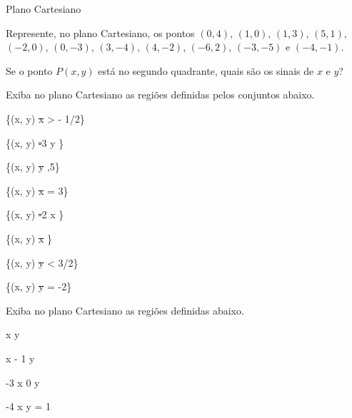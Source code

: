 \begin{exercicios}{Plano Cartesiano}
\begin{exercicio}
\begin{answers}
        \end{answers}
    \end{exercicio}

    \begin{exercicio}
        Represente, no plano Cartesiano, os pontos 
        $(0,4)$, $(1,0)$, $(1,3)$, $(5,1)$, $(-2,0)$, $(0,-3)$, $(3,-4)$, $(4,-2)$, $(-6,2)$, $(-3,-5)$ e $(-4,-1)$.
        \begin{answers}
        \end{answers}
    \end{exercicio}
    
    \begin{exercicio}
        Se o ponto $P(x,y)$ está no segundo quadrante, quais são os sinais de $x$ e $y$?
    \end{exercicio}
    
    \begin{exercicio}
        Exiba no plano Cartesiano as regiões definidas pelos conjuntos abaixo.
	    \begin{mathlist}[2]
	    	\item \{(x, y) \st x > - 1/2\}
	    	\item \{(x, y) \st -3 \leq y \leq 0\}
	    	\item \{(x, y) \st y ,5\}
	    	\item \{(x, y) \st x = 3\}
	    	\item \{(x, y) \st -2 \leq x \leq 5\}
	    	\item \{(x, y) \st x \}
	    	\item \{(x, y) \st y < 3/2\}
	    	\item \{(x, y) \st y = -2\}
	    \end{mathlist}      
    \end{exercicio}
    
    \begin{exercicio}
        Exiba no plano Cartesiano as regiões definidas abaixo.
	    \begin{mathlist}
	    	\item x   y 
	    	\item x \geq - 1  y 
	    	\item -3 \leq x   0 \leq y \leq 3
	    	\item -4 \leq x   y = 1
	    \end{mathlist}        
    \end{exercicio}
    

\end{exercicios}
